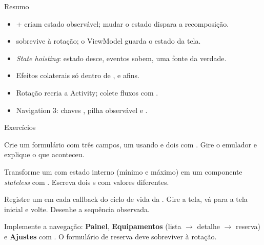 \documentclass[aspectratio=169,10pt]{beamer}
\begin{document}
\begin{frame}{Resumo}
  \begin{resumo}
    \begin{itemize}
      \item {} +  criam estado observável; mudar o estado dispara a recomposição.
      \item {} sobrevive à rotação; o ViewModel guarda o estado da tela.
      \item \emph{State hoisting}: estado desce, eventos sobem, uma fonte da verdade.
      \item Efeitos colaterais só dentro de ,  e afins.
      \item Rotação recria a Activity; colete fluxos com .
      \item Navigation 3: chaves , pilha observável e .
    \end{itemize}
  \end{resumo}
\end{frame}

\begin{frame}{Exercícios}
  \begin{exercicio}
    Crie um formulário com três campos, um usando  e dois com . Gire o emulador e explique o que aconteceu.
  \end{exercicio}
  \begin{exercicio}
    Transforme um  com estado interno (mínimo e máximo) em um componente \emph{stateless} com . Escreva dois s com valores diferentes.
  \end{exercicio}
  \begin{exercicio}
    Registre um  em cada callback do ciclo de vida da . Gire a tela, vá para a tela inicial e volte. Desenhe a sequência observada.
  \end{exercicio}
  \begin{projeto}
    Implemente a navegação: \textbf{Painel}, \textbf{Equipamentos} (lista $\rightarrow$ detalhe $\rightarrow$ reserva) e \textbf{Ajustes} com . O formulário de reserva deve sobreviver à rotação.
  \end{projeto}
\end{frame}
\end{document}

